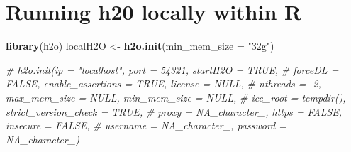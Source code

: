 \documentclass[]{book}
\newenvironment{Shaded}{\begin{snugshade}}{\end{snugshade}}
\newcommand{\KeywordTok}[1]{\textcolor[rgb]{0.13,0.29,0.53}{\textbf{#1}}}
\newcommand{\DataTypeTok}[1]{\textcolor[rgb]{0.13,0.29,0.53}{#1}}
\newcommand{\StringTok}[1]{\textcolor[rgb]{0.31,0.60,0.02}{#1}}
\newcommand{\CommentTok}[1]{\textcolor[rgb]{0.56,0.35,0.01}{\textit{#1}}}
\newcommand{\OtherTok}[1]{\textcolor[rgb]{0.56,0.35,0.01}{#1}}
\newcommand{\ControlFlowTok}[1]{\textcolor[rgb]{0.13,0.29,0.53}{\textbf{#1}}}
\newcommand{\OperatorTok}[1]{\textcolor[rgb]{0.81,0.36,0.00}{\textbf{#1}}}
\newcommand{\NormalTok}[1]{#1}
\theoremstyle{definition}
\theoremstyle{definition}
\theoremstyle{definition}
\theoremstyle{remark}
\begin{document}
\begin{Shaded}
\end{Shaded}

\section{Running h20 locally within
R}\label{running-h20-locally-within-r}

\begin{Shaded}
\begin{Highlighting}[]
\KeywordTok{library}\NormalTok{(h2o)}
\NormalTok{localH2O <-}\StringTok{ }\KeywordTok{h2o.init}\NormalTok{(}\DataTypeTok{min_mem_size =} \StringTok{"32g"}\NormalTok{)}
\end{Highlighting}
\end{Shaded}

\begin{Shaded}
\begin{Highlighting}[]
\CommentTok{# h2o.init(ip = "localhost", port = 54321, startH2O = TRUE,}
\CommentTok{#          forceDL = FALSE, enable_assertions = TRUE, license = NULL,}
\CommentTok{#          nthreads = -2, max_mem_size = NULL, min_mem_size = NULL,}
\CommentTok{#          ice_root = tempdir(), strict_version_check = TRUE,}
\CommentTok{#          proxy = NA_character_, https = FALSE, insecure = FALSE,}
\CommentTok{#          username = NA_character_, password = NA_character_)}
\end{Highlighting}
\end{Shaded}
\end{document}
